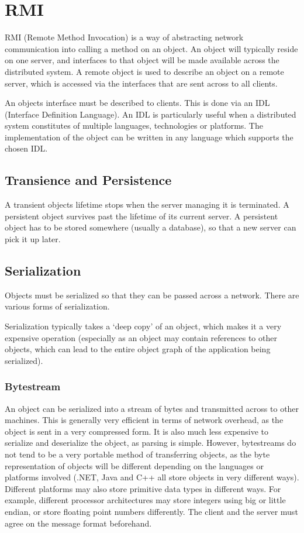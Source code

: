 \documentclass{article}
\begin{document}
\section{RMI}
RMI (Remote Method Invocation) is a way of abstracting network communication into calling a method on an object. An object will typically reside on one server, and interfaces to that object will be made available across the distributed system. A remote object is used to describe an object on a remote server, which is accessed via the interfaces that are sent across to all clients. 

An objects interface must be described to clients. This is done via an IDL (Interface Definition Language). An IDL is particularly useful when a distributed system constitutes of multiple languages, technologies or platforms. The implementation of the object can be written in any language which supports the chosen IDL. 

\subsection{Transience and Persistence}
A transient objects lifetime stops when the server managing it is terminated. A persistent object survives past the lifetime of its current server. A persistent object has to be stored somewhere (usually a database), so that a new server can pick it up later. 

\subsection{Serialization}
Objects must be serialized so that they can be passed across a network. There are various forms of serialization. 

Serialization typically takes a `deep copy' of an object, which makes it a very expensive operation (especially as an object may contain references to other objects, which can lead to the entire object graph of the application being serialized).

\subsubsection{Bytestream}
An object can be serialized into a stream of bytes and transmitted across to other machines. This is generally very efficient in terms of network overhead, as the object is sent in a very compressed form. It is also much less expensive to serialize and deserialize the object, as parsing is simple. However, bytestreams do not tend to be a very portable method of transferring objects, as the byte representation of objects will be different depending on the languages or platforms involved (.NET, Java and C++ all store objects in very different ways). Different platforms may also store primitive data types in different ways. For example, different processor architectures may store integers using big or little endian, or store floating point numbers differently. The client and the server must agree on the message format beforehand.
\end{document}
